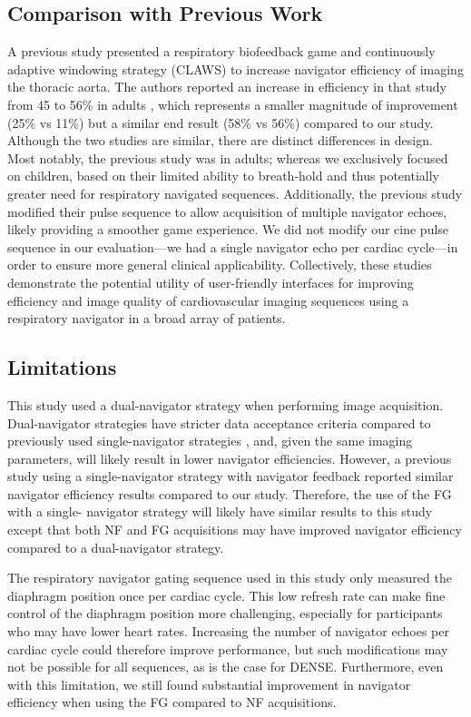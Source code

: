 	\subsection{Comparison with Previous Work}
		A previous study presented a respiratory biofeedback game and continuously adaptive windowing strategy (CLAWS) to increase navigator efficiency of imaging the thoracic aorta. The authors reported an increase in efficiency in that study from 45 to 56\% in adults \cite{Jhooti2011}, which represents a smaller magnitude of improvement (25\% vs 11\%) but a similar end result (58\% vs 56\%) compared to our study. Although the two studies are similar, there are distinct differences in design. Most notably, the previous study was in adults; whereas we exclusively focused on children, based on their limited ability to breath-hold and thus potentially greater need for respiratory navigated sequences. Additionally, the previous study modified their pulse sequence to allow acquisition of multiple navigator echoes, likely providing a smoother game experience. We did not modify our cine pulse sequence in our evaluation—we had a single navigator echo per cardiac cycle—in order to ensure more general clinical applicability. Collectively, these studies demonstrate the potential utility of user-friendly interfaces for improving efficiency and image quality of cardiovascular imaging sequences using a respiratory navigator in a broad array of patients.
	
	\subsection{Limitations}
		This study used a dual-navigator strategy when performing image acquisition. Dual-navigator strategies have stricter data acceptance criteria compared to previously used single-navigator strategies \cite{Zhong2010a}, and, given the same imaging parameters, will likely result in lower navigator efficiencies. However, a previous study using a single-navigator strategy with navigator feedback reported similar navigator efficiency results compared to our study. Therefore, the use of the FG with a single- navigator strategy will likely have similar results to this study except that both NF and FG acquisitions may have improved navigator efficiency compared to a dual-navigator strategy.
		
		The respiratory navigator gating sequence used in this study only measured the diaphragm position once per cardiac cycle. This low refresh rate can make fine control of the diaphragm position more challenging, especially for participants who may have lower heart rates. Increasing the number of navigator echoes per cardiac cycle could therefore improve performance, but such modifications may not be possible for all sequences, as is the case for DENSE. Furthermore, even with this limitation, we still found substantial improvement in navigator efficiency when using the FG compared to NF acquisitions.
		

